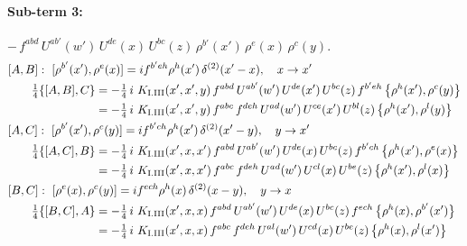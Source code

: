 \documentclass[10pt]{article}
\numberwithin{equation}{section}
\begin{document}
\paragraph{Sub-term 3:} $-\,f^{abd}\,U^{ab'}(w')\,U^{de}(x)\,U^{bc}(z)\,\rho^{b'}(x')\,\rho^{e}(x)\,\rho^{c}(y)$.
\begin{align}
&[A,B]:\ [\rho^{b'}(x'),\rho^{e}(x)]=i f^{b'eh}\rho^{h}(x')\,\delta^{(2)}(x'-x),\quad x\to x'\notag\\
&\qquad \tfrac14\{[A,B],C\}=-\tfrac14\,i\,\,K_{\rm I.III}(x',x',y)\,f^{abd}\,U^{ab'}(w')\,U^{de}(x')\,U^{bc}(z)\,f^{b'eh}\,\big\{\rho^{h}(x'),\rho^{c}(y)\big\}\notag\\
&\qquad\phantom{\tfrac14\{[A,B],C\}}=-\tfrac14\,i\,\,K_{\rm I.III}(x',x',y)\,f^{abc}\,f^{deh}\,U^{ad}(w')\,U^{ce}(x')\,U^{bl}(z)\,\big\{\rho^{h}(x'),\rho^{l}(y)\big\}
\label{R:eq:GI.III-3-AB}\\
&[A,C]:\ [\rho^{b'}(x'),\rho^{c}(y)]=i f^{b'ch}\rho^{h}(x')\,\delta^{(2)}(x'-y),\quad y\to x'\notag\\
&\qquad \tfrac14\{[A,C],B\}=-\tfrac14\,i\,\,K_{\rm I.III}(x',x,x')\,f^{abd}\,U^{ab'}(w')\,U^{de}(x)\,U^{bc}(z)\,f^{b'ch}\,\big\{\rho^{h}(x'),\rho^{e}(x)\big\}\notag\\
&\qquad\phantom{\tfrac14\{[A,C],B\}}=-\tfrac14\,i\,\,K_{\rm I.III}(x',x,x')\,f^{abc}\,f^{deh}\,U^{ad}(w')\,U^{cl}(x)\,U^{be}(z)\,\big\{\rho^{h}(x'),\rho^{l}(x)\big\}
\label{R:eq:GI.III-3-AC}\\
&[B,C]:\ [\rho^{e}(x),\rho^{c}(y)]=i f^{ech}\rho^{h}(x)\,\delta^{(2)}(x-y),\quad y\to x\notag\\
&\qquad \tfrac14\{[B,C],A\}=-\tfrac14\,i\,\,K_{\rm I.III}(x',x,x)\,f^{abd}\,U^{ab'}(w')\,U^{de}(x)\,U^{bc}(z)\,f^{ech}\,\big\{\rho^{h}(x),\rho^{b'}(x')\big\}\notag\\
&\qquad\phantom{\tfrac14\{[B,C],A\}}=-\tfrac14\,i\,\,K_{\rm I.III}(x',x,x)\,f^{abc}\,f^{deh}\,U^{al}(w')\,U^{cd}(x)\,U^{be}(z)\,\big\{\rho^{h}(x),\rho^{l}(x')\big\}
\label{R:eq:GI.III-3-BC}
\end{align}
\end{document}

